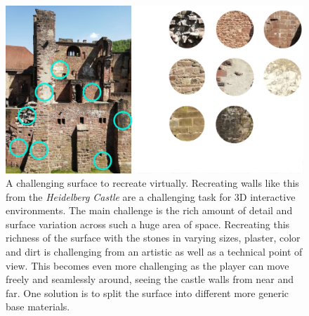 \begin{figure}
	\centering
	\includegraphics[width=0.8\linewidth]{images/01cha_02_HeidelbergCastle_mats.png}
	\caption{A challenging surface to recreate virtually. Recreating walls like this from the \emph{Heidelberg Castle} are a challenging task for 3D interactive environments. The main challenge is the rich amount of detail and surface variation across such a huge area of space. Recreating this richness of the surface with the stones in varying sizes, plaster, color and dirt is challenging from an artistic as well as a technical point of view. This becomes even more challenging as the player can move freely and seamlessly around, seeing the castle walls from near and far. One solution is to split the surface into different more generic base materials.}
	\label{fig:heidelbergCastle}
\end{figure}


